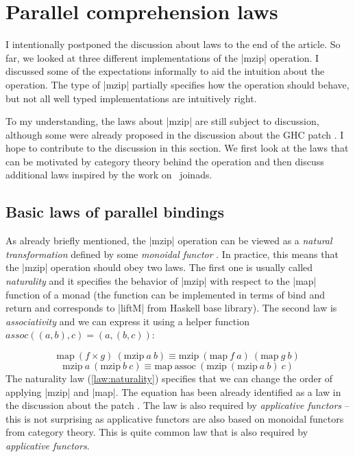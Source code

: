 \documentclass{tmr}
\begin{document}

\section{Parallel comprehension laws}
I intentionally postponed the discussion about laws to the end of the article. So far, we looked
at three different implementations of the |mzip| operation. I discussed some of the expectations
informally to aid the intuition about the operation. The type of |mzip| partially specifies how 
the operation should behave, but not all well typed implementations are intuitively right.

To my understanding, the laws about |mzip| are still subject to discussion, although some were 
already proposed in the discussion about the GHC patch \cite{bringbackmc}. I hope to contribute to
the discussion in this section. We first look at the laws that can be motivated by category theory
behind the operation and then discuss additional laws inspired by the work on 
\fsharp \ joinads.


\subsection{Basic laws of parallel bindings}
As already briefly mentioned, the |mzip| operation can be viewed as a \textit{natural 
transformation} defined by some \textit{monoidal functor} \cite{monoidalfunctor}. In practice,
this means that the |mzip| operation should obey two laws. The first one is usually called 
\textit{naturality} and it specifies the behavior of |mzip| with respect to the |map| function of 
a monad (the function can be implemented in terms of bind and return and corresponds to 
|liftM| from Haskell base library). The second law is \textit{associativity} and we can express it 
using a helper function $assoc((a,b),c)=(a,(b,c))$:

\begin{equation}
  \text{map} \: (f \times g) \: (\text{mzip} \: a \: b) \equiv \text{mzip} \: (\text{map} \: f \: a) \: (\text{map} \: g \: b)
  \label{law:naturality}
\end{equation}
\begin{equation}
  \text{mzip} \: a \: (\text{mzip} \: b \: c) \equiv \text{map} \: \text{assoc} \: (\text{mzip} \: (\text{mzip} \: a \: b) \: c) 
  \label{law:assoc}
\end{equation}
The naturality law (\ref{law:naturality}) specifies that we can change the order of applying 
|mzip| and |map|. The equation has been already identified as a law in the discussion about the
patch \cite{bringbackmc}. The law is also required by \textit{applicative functors} 
\cite{applicative} -- this is not surprising as applicative functors are also based on monoidal 
functors from category theory. This is quite common law that is also required by 
\textit{applicative functors}.
\end{document}
